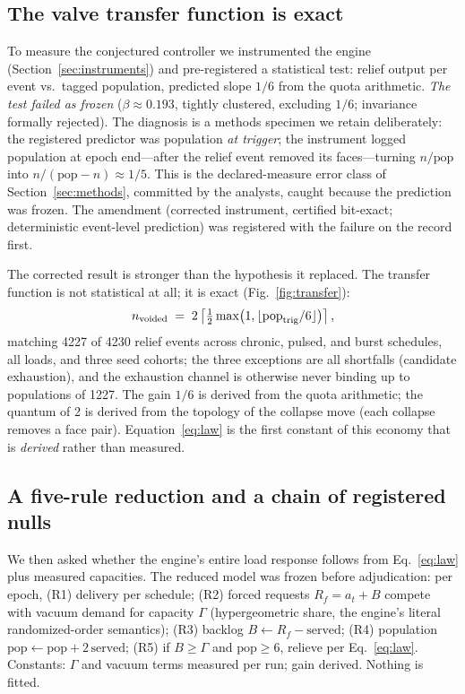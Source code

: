 \documentclass[11pt]{article}
\begin{document}
\subsection{The valve transfer function is exact}\label{sec:t1}
To measure the conjectured controller we instrumented the engine
(Section~\ref{sec:instruments}) and pre-registered a statistical test: relief
output per event vs.\ tagged population, predicted slope $1/6$ from the quota
arithmetic. \emph{The test failed as frozen} ($\beta\approx0.193$, tightly
clustered, excluding $1/6$; invariance formally rejected). The diagnosis is a
methods specimen we retain deliberately: the registered predictor was
population \emph{at trigger}; the instrument logged population at epoch
end---after the relief event removed its faces---turning $n/\mathrm{pop}$ into
$n/(\mathrm{pop}-n)\approx1/5$. This is the declared-measure error class of
Section~\ref{sec:methods}, committed by the analysts, caught because the
prediction was frozen. The amendment (corrected instrument, certified
bit-exact; deterministic event-level prediction) was registered with the
failure on the record first.

The corrected result is stronger than the hypothesis it replaced. The
transfer function is not statistical at all; it is exact
(Fig.~\ref{fig:transfer}):
\begin{equation}
n_{\rm voided} \;=\; 2\left\lceil \tfrac{1}{2}\max\!\big(1,\lfloor
\mathrm{pop}_{\rm trig}/6\rfloor\big)\right\rceil ,
\label{eq:law}
\end{equation}
matching 4227 of 4230 relief events across chronic, pulsed, and burst
schedules, all loads, and three seed cohorts; the three exceptions are all
shortfalls (candidate exhaustion), and the exhaustion channel is otherwise
never binding up to populations of 1227. The gain $1/6$ is derived from the
quota arithmetic; the quantum of 2 is derived from the topology of the
collapse move (each collapse removes a face pair). Equation~\ref{eq:law} is
the first constant of this economy that is \emph{derived} rather than
measured.

\subsection{A five-rule reduction and a chain of registered nulls}
We then asked whether the engine's entire load response follows from
Eq.~\ref{eq:law} plus measured capacities. The reduced model was frozen
before adjudication: per epoch, (R1) delivery per schedule; (R2) forced
requests $R_f=a_t+B$ compete with vacuum demand for capacity $\Gamma$
(hypergeometric share, the engine's literal randomized-order semantics);
(R3) backlog $B\!\leftarrow\!R_f-\mathrm{served}$; (R4) population
$\mathrm{pop}\!\leftarrow\!\mathrm{pop}+2\,\mathrm{served}$; (R5) if
$B\ge\Gamma$ and $\mathrm{pop}\ge6$, relieve per Eq.~\ref{eq:law}. Constants:
$\Gamma$ and vacuum terms measured per run; gain derived. Nothing is fitted.
\end{document}
